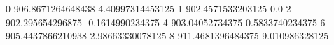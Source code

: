 0 906.8671264648438 4.40997314453125
1 902.4571533203125 0.0
2 902.295654296875 -0.1614990234375
4 903.04052734375 0.5833740234375
6 905.4437866210938 2.98663330078125
8 911.4681396484375 9.010986328125
